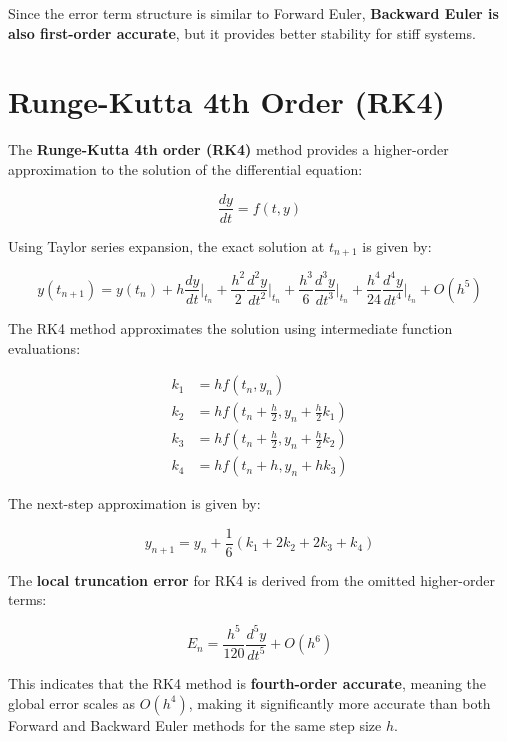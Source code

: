 \documentclass[12pt,a4paper]{report}
\begin{document}
Since the error term structure is similar to Forward Euler, \textbf{Backward Euler is also first-order accurate}, but it provides better stability for stiff systems.
\section{Runge-Kutta 4th Order (RK4)}
The \textbf{Runge-Kutta 4th order (RK4)} method provides a higher-order approximation to the solution of the differential equation:

\begin{equation}
\frac{dy}{dt} = f(t, y)
\end{equation}

Using Taylor series expansion, the exact solution at $ t_{n+1} $ is given by:

\begin{equation}
y(t_{n+1}) = y(t_n) + h \frac{dy}{dt} \Big|_{t_n} + \frac{h^2}{2} \frac{d^2y}{dt^2} \Big|_{t_n} + \frac{h^3}{6} \frac{d^3y}{dt^3} \Big|_{t_n} + \frac{h^4}{24} \frac{d^4y}{dt^4} \Big|_{t_n} + O(h^5)
\end{equation}

The RK4 method approximates the solution using intermediate function evaluations:

\begin{align}
k_1 &= hf(t_n, y_n) \\
k_2 &= hf\left(t_n + \frac{h}{2}, y_n + \frac{h}{2} k_1 \right) \\
k_3 &= hf\left(t_n + \frac{h}{2}, y_n + \frac{h}{2} k_2 \right) \\
k_4 &= hf(t_n + h, y_n + h k_3)
\end{align}

The next-step approximation is given by:

\begin{equation}
y_{n+1} = y_n + \frac{1}{6} (k_1 + 2k_2 + 2k_3 + k_4)
\end{equation}

The \textbf{local truncation error} for RK4 is derived from the omitted higher-order terms:

\begin{equation}
E_n = \frac{h^5}{120} \frac{d^5y}{dt^5} + O(h^6)
\end{equation}

This indicates that the RK4 method is \textbf{fourth-order accurate}, meaning the global error scales as $ O(h^4) $, making it significantly more accurate than both Forward and Backward Euler methods for the same step size $ h $.\\
\end{document}
